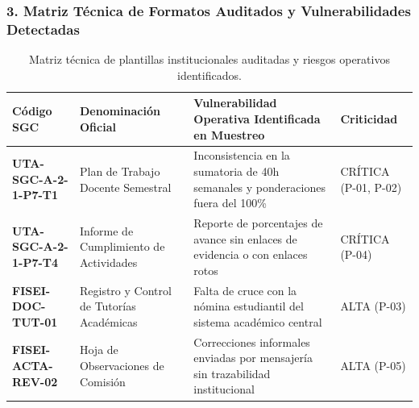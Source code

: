 \documentclass[12pt,a4paper]{article}
\begin{document}
\subsubsection*{3. Matriz Técnica de Formatos Auditados y Vulnerabilidades Detectadas}
\begin{table}[H]
\centering
\small
\renewcommand{\arraystretch}{1.2}
\begin{tabularx}{\textwidth}{|>{\hsize=0.65\hsize\centering\arraybackslash\bfseries\footnotesize}X|>{\hsize=1.2\hsize\raggedright\arraybackslash\footnotesize}X|>{\hsize=1.5\hsize\raggedright\arraybackslash\footnotesize}X|>{\hsize=0.65\hsize\centering\arraybackslash\footnotesize}X|}
\hline
\rowcolor{tableheader}
\textbf{Código SGC} & \textbf{Denominación Oficial} & \textbf{Vulnerabilidad Operativa Identificada en Muestreo} & \textbf{Criticidad} \\
\hline
UTA-SGC-A-2-1-P7-T1 & Plan de Trabajo Docente Semestral & Inconsistencia en la sumatoria de 40h semanales y ponderaciones fuera del 100\% & CRÍTICA (P-01, P-02) \\
\hline
UTA-SGC-A-2-1-P7-T4 & Informe de Cumplimiento de Actividades & Reporte de porcentajes de avance sin enlaces de evidencia o con enlaces rotos & CRÍTICA (P-04) \\
\hline
FISEI-DOC-TUT-01 & Registro y Control de Tutorías Académicas & Falta de cruce con la nómina estudiantil del sistema académico central & ALTA (P-03) \\
\hline
FISEI-ACTA-REV-02 & Hoja de Observaciones de Comisión & Correcciones informales enviadas por mensajería sin trazabilidad institucional & ALTA (P-05) \\
\hline
\end{tabularx}
\caption{Matriz técnica de plantillas institucionales auditadas y riesgos operativos identificados.}
\end{table}
\end{document}
